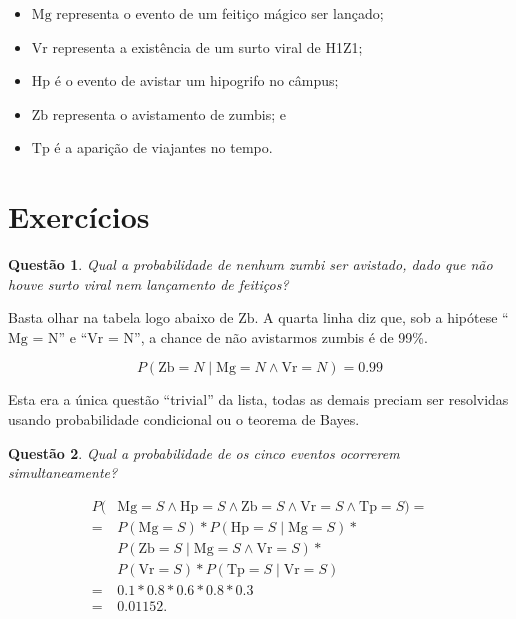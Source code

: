 \documentclass{article}
\newtheorem{question}{Questão}
\newcommand{\Mg}{\mathrm{Mg}}
\newcommand{\Vr}{\mathrm{Vr}}
\newcommand{\Hp}{\mathrm{Hp}}
\newcommand{\Zb}{\mathrm{Zb}}
\newcommand{\Tp}{\mathrm{Tp}}
\begin{document}
\begin{itemize}
    \item $\Mg$ representa o evento de um feitiço mágico ser lançado;
    \item $\Vr$ representa a existência de um surto viral de H1Z1;
    \item $\Hp$ é o evento de avistar um hipogrifo no câmpus;
    \item $\Zb$ representa o avistamento de zumbis; e
    \item $\Tp$ é a aparição de viajantes no tempo.
\end{itemize}

\section{Exercícios}

\begin{question}
    Qual a probabilidade de nenhum zumbi ser avistado,
    dado que não houve surto viral nem lançamento de feitiços?
\end{question}

Basta olhar na tabela logo abaixo de $\Zb$.
A quarta linha diz que,
sob a hipótese ``$\Mg$ = N'' e ``$\Vr$ = N'',
a chance de não avistarmos zumbis é de 99\%.

\begin{equation*}
    P(\Zb = N \mid \Mg = N \wedge \Vr = N) = 0.99
\end{equation*}

Esta era a única questão ``trivial'' da lista,
todas as demais preciam ser resolvidas
usando probabilidade condicional ou o teorema de Bayes.

\begin{question}
    Qual a probabilidade de os cinco eventos ocorrerem simultaneamente?
\end{question}

\begin{align*}
    P (&\Mg = S \wedge \Hp = S \wedge \Zb = S \wedge \Vr = S \wedge \Tp = S) = \\
        = & P(\Mg = S) * P(\Hp = S \mid \Mg = S) * {}\\
          & P(\Zb = S \mid \Mg = S \wedge \Vr = S) * {}\\
          & P(\Vr = S) * P(\Tp = S \mid \Vr = S) \\
        = & 0.1 * 0.8 * 0.6 * 0.8 * 0.3\\
        = & 0.01152.
\end{align*}
\end{document}
